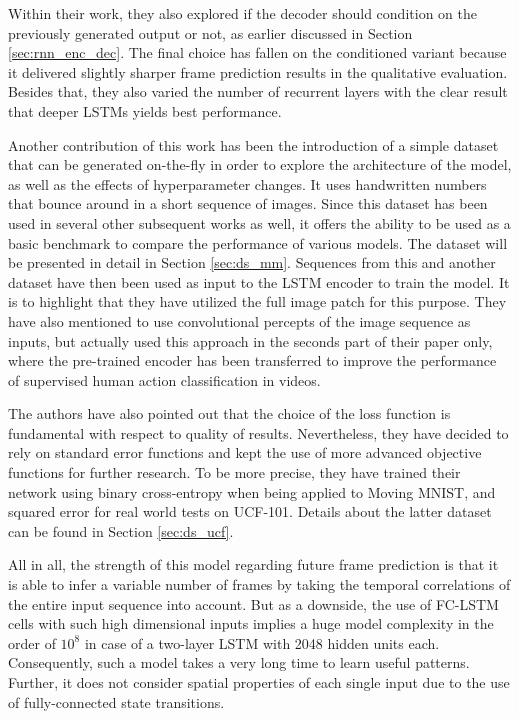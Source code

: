 Within their work, they also explored if the decoder should condition on the previously generated output or not, as earlier discussed in Section \ref{sec:rnn_enc_dec}. The final choice has fallen on the conditioned variant because it delivered slightly sharper frame prediction results in the qualitative evaluation. Besides that, they also varied the number of recurrent layers with the clear result that deeper LSTMs yields best performance.

Another contribution of this work has been the introduction of a simple dataset that can be generated on-the-fly in order to explore the architecture of the model, as well as the effects of hyperparameter changes. It uses handwritten numbers that bounce around in a short sequence of images. Since this dataset has been used in several other subsequent works as well, it offers the ability to be used as a basic benchmark to compare the performance of various models. The dataset will be presented in detail in Section \ref{sec:ds_mm}. Sequences from this and another dataset have then been used as input to the LSTM encoder to train the model. It is to highlight that they have utilized the full image patch for this purpose. They have also mentioned to use convolutional percepts of the image sequence as inputs, but actually used this approach in the seconds part of their paper only, where the pre-trained encoder has been transferred to improve the performance of supervised human action classification in videos.

The authors have also pointed out that the choice of the loss function is fundamental with respect to quality of results. Nevertheless, they have decided to rely on standard error functions and kept the use of more advanced objective functions for further research. To be more precise, they have trained their network using binary cross-entropy when being applied to Moving MNIST, and squared error for real world tests on UCF-101. Details about the latter dataset can be found in Section \ref{sec:ds_ucf}.

All in all, the strength of this model regarding future frame prediction is that it is able to infer a variable number of frames by taking the temporal correlations of the entire input sequence into account. But as a downside, the use of FC-LSTM cells with such high dimensional inputs implies a huge model complexity in the order of $10^8$ in case of a two-layer LSTM with \num{2048} hidden units each. Consequently, such a model takes a very long time to learn useful patterns. Further, it does not consider spatial properties of each single input due to the use of fully-connected state transitions.


